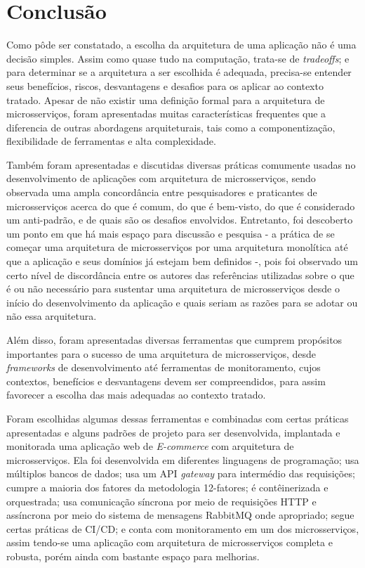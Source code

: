 \chapter{Conclusão}\label{chapter-conclusao}
Como pôde ser constatado, a escolha da arquitetura de uma aplicação não é uma decisão simples. Assim como quase tudo na computação, trata-se de \emph{tradeoffs}; e para determinar se a arquitetura a ser escolhida é adequada, precisa-se entender seus benefícios, riscos, desvantagens e desafios para os aplicar ao contexto tratado. Apesar de não existir uma definição formal para a arquitetura de microsserviços, foram apresentadas muitas características frequentes que a diferencia de outras abordagens arquiteturais, tais como a componentização, flexibilidade de ferramentas e alta complexidade.

Também foram apresentadas e discutidas diversas práticas comumente usadas no desenvolvimento de aplicações com arquitetura de microsserviços, sendo observada uma ampla concordância entre pesquisadores e praticantes de microsserviços acerca do que é comum, do que é bem-visto, do que é considerado um anti-padrão, e de quais são os desafios envolvidos. Entretanto, foi descoberto um ponto em que há mais espaço para discussão e pesquisa - a prática de se começar uma arquitetura de microsserviços por uma arquitetura monolítica até que a aplicação e seus domínios já estejam bem definidos -, pois foi observado um certo nível de discordância entre os autores das referências utilizadas sobre o que é ou não necessário para sustentar uma arquitetura de microsserviços desde o início do desenvolvimento da aplicação e quais seriam as razões para se adotar ou não essa arquitetura.

Além disso, foram apresentadas diversas ferramentas que cumprem propósitos importantes para o sucesso de uma arquitetura de microsserviços, desde \emph{frameworks} de desenvolvimento até ferramentas de monitoramento, cujos contextos, benefícios e desvantagens devem ser compreendidos, para assim favorecer a escolha das mais adequadas ao contexto tratado. 

Foram escolhidas algumas dessas ferramentas e combinadas com certas práticas apresentadas e alguns padrões de projeto para ser desenvolvida, implantada e monitorada uma aplicação web de \emph{E-commerce} com arquitetura de microsserviços. Ela foi desenvolvida em diferentes linguagens de programação; usa múltiplos bancos de dados; usa um API \emph{gateway} para intermédio das requisições; cumpre a maioria dos fatores da metodologia 12-fatores; é contêinerizada e orquestrada; usa comunicação síncrona por meio de requisições HTTP e assíncrona por meio do sistema de mensagens RabbitMQ onde apropriado; segue certas práticas de CI/CD; e conta com monitoramento em um dos microsserviços, assim tendo-se uma aplicação com arquitetura de microsserviços completa e robusta, porém ainda com bastante espaço para melhorias. 

